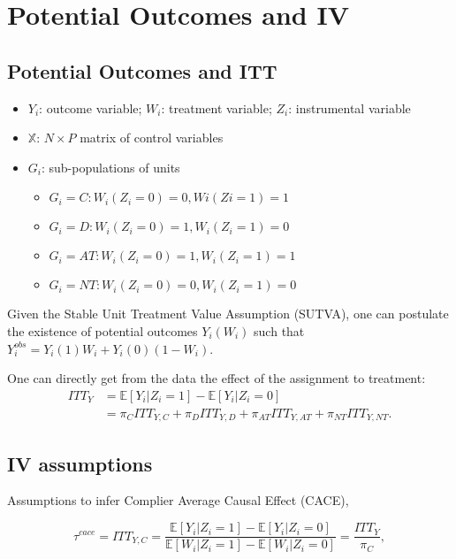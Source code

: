 \chapter{Potential Outcomes and IV}



\section{Potential Outcomes and ITT}

\begin{itemize}
 \item $Y_i$: outcome variable; $W_i$: treatment variable; $Z_i$: instrumental variable
 \item $\mathbb{X}$: $N \times P$ matrix of control variables
 \item $G_i$: sub-populations of units
 \begin{itemize}
    \item $G_i=C: W_i(Z_i = 0) = 0, Wi(Zi = 1) = 1$
    \item $G_i=D: W_i(Z_i = 0) = 1, W_i(Z_i = 1) = 0$
    \item $G_i=AT: W_i(Z_i = 0) = 1, W_i(Z_i = 1) = 1$
    \item $G_i=NT: W_i(Z_i = 0) = 0, W_i(Z_i = 1) = 0$
 \end{itemize}
\end{itemize} 

Given the Stable Unit Treatment Value Assumption (SUTVA), one can postulate the existence of potential outcomes $Y_i(W_i)$ such that $Y_i^{obs} = Y_i(1)W_i + Y_i(0)(1-W_i)$.

One can directly get from the data the effect of the assignment to treatment: 
$$
\begin{aligned}
ITT_Y &= \mathbb{E}[Y_i|Z_i=1] - \mathbb{E}[Y_i|Z_i=0] \\
&= \pi_C ITT_{Y,C} + \pi_D ITT_{Y,D} + \pi_{AT} ITT_{Y,AT} + \pi_{NT} ITT_{Y,NT}.
\end{aligned}
$$


\section{IV assumptions}

Assumptions to infer Complier Average Causal Effect (CACE),  

$$
\tau^{cace} = ITT_{Y,C} = \frac{\mathbb{E}[Y_i|Z_i=1]-\mathbb{E}[Y_i|Z_i=0]}{\mathbb{E}[W_i|Z_i=1]-\mathbb{E}[W_i|Z_i=0]} = \frac{ITT_Y}{\pi_C}, 
$$ 

